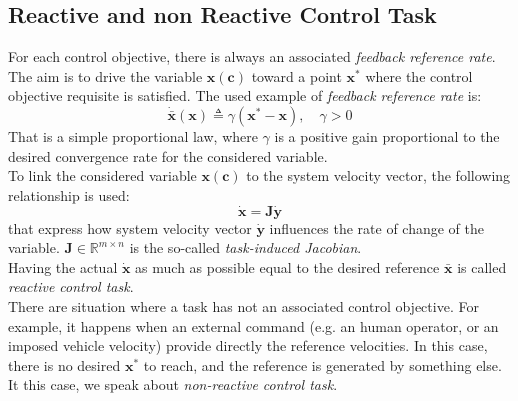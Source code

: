 \subsection{Reactive and non Reactive Control Task}
\label{sec:reactNonReact}
For each control objective, there is always an associated \textit{feedback reference rate}. The aim is to drive the variable $\boldsymbol{x}(\boldsymbol{c})$ toward a point $ \boldsymbol{x}^* $ where the control objective requisite is satisfied. The used example of \textit{feedback reference rate} is:
\begin{equation}
	\boldsymbol{\dot{{\bar{x}}}} (\boldsymbol{x}) \triangleq \gamma (\boldsymbol{x}^* - \boldsymbol{x}),\quad \gamma > 0
\end{equation}
That is a simple proportional law, where $\gamma$ is a positive gain proportional to the desired convergence rate for the considered variable.\\

To link the considered variable $ \boldsymbol{x}(\boldsymbol{c})$ to the system velocity vector, the following relationship is used:
\begin{equation}
\label{eq:CartJacVel}
	\dot{\boldsymbol{x}} = \boldsymbol{J} \dot{\boldsymbol{y}}
\end{equation} 
that express how system velocity vector $\dot{\boldsymbol{y}}$ influences the rate of change of the variable. $ \boldsymbol{J} \in \mathbb{R}^{m \times n}$ is the so-called \textit{task-induced Jacobian}.\\
Having the actual $\dot{\boldsymbol{x}}$ as much as possible equal to the desired reference $\boldsymbol{\bar{x}}$ is called \textit{reactive control task}.\\

There are situation where a task has not an associated control objective. For example, it happens when an external command (e.g. an human operator, or an imposed vehicle velocity) provide directly the reference velocities. In this case, there is no desired $\boldsymbol{x}^*$ to reach, and the reference is generated by something else. It this case, we speak about \textit{non-reactive control task}.


